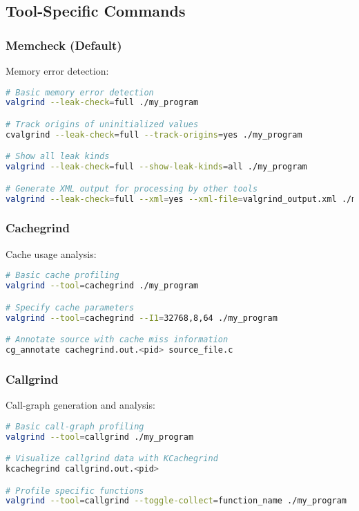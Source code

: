 \documentclass[11pt,a4paper]{article}
\begin{document}
\subsection{Tool-Specific Commands}

\subsubsection{Memcheck (Default)}
Memory error detection:

\begin{lstlisting}[caption=Using Memcheck for memory error detection, language=bash]
# Basic memory error detection
valgrind --leak-check=full ./my_program

# Track origins of uninitialized values
cvalgrind --leak-check=full --track-origins=yes ./my_program

# Show all leak kinds
valgrind --leak-check=full --show-leak-kinds=all ./my_program

# Generate XML output for processing by other tools
valgrind --leak-check=full --xml=yes --xml-file=valgrind_output.xml ./my_program
\end{lstlisting}

\subsubsection{Cachegrind}
Cache usage analysis:

\begin{lstlisting}[caption=Using Cachegrind for cache profiling, language=bash]
# Basic cache profiling
valgrind --tool=cachegrind ./my_program

# Specify cache parameters
valgrind --tool=cachegrind --I1=32768,8,64 ./my_program

# Annotate source with cache miss information
cg_annotate cachegrind.out.<pid> source_file.c
\end{lstlisting}

\subsubsection{Callgrind}
Call-graph generation and analysis:

\begin{lstlisting}[caption=Using Callgrind for call-graph profiling, language=bash]
# Basic call-graph profiling
valgrind --tool=callgrind ./my_program

# Visualize callgrind data with KCachegrind
kcachegrind callgrind.out.<pid>

# Profile specific functions
valgrind --tool=callgrind --toggle-collect=function_name ./my_program
\end{lstlisting}
\end{document}
